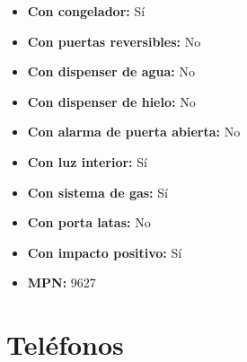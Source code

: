 \documentclass{article}
\begin{document}
\begin{adjustwidth}{2em}{}
\begin{itemize}
\begin{itemize}
    \item \textbf {Con congelador:} Sí
    \item \textbf {Con puertas reversibles:} No
    \item \textbf {Con dispenser de agua:} No
    \item \textbf {Con dispenser de hielo:} No
    \item \textbf {Con alarma de puerta abierta:} No
    \item \textbf {Con luz interior:} Sí
    \item \textbf {Con sistema de gas:} Sí
    \item \textbf {Con porta latas:} No
    \item \textbf {Con impacto positivo:} Sí
    \item \textbf {MPN:} 9627
    \end{itemize}
\end{itemize}

\vspace{1\baselineskip} %
\end{adjustwidth}


\section*{Teléfonos}
\setcounter{subsection}{0} %
\end{document}
